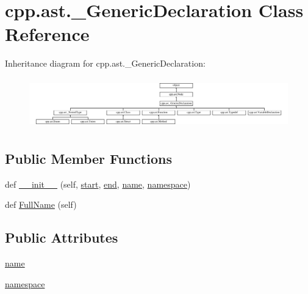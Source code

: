 \hypertarget{classcpp_1_1ast_1_1__GenericDeclaration}{}\section{cpp.\+ast.\+\_\+\+Generic\+Declaration Class Reference}
\label{classcpp_1_1ast_1_1__GenericDeclaration}
Inheritance diagram for cpp.\+ast.\+\_\+\+Generic\+Declaration\+:\begin{figure}[H]
\begin{center}
\leavevmode
\includegraphics[height=2.197802cm]{classcpp_1_1ast_1_1__GenericDeclaration}
\end{center}
\end{figure}
\subsection*{Public Member Functions}
\begin{DoxyCompactItemize}
\item 
def \mbox{\hyperlink{classcpp_1_1ast_1_1__GenericDeclaration_afde72751e20708a7802eb7707d23bc3c}{\+\_\+\+\_\+init\+\_\+\+\_\+}} (self, \mbox{\hyperlink{classcpp_1_1ast_1_1Node_a7b2aa97e6a049bb1a93aea48c48f1f44}{start}}, \mbox{\hyperlink{classcpp_1_1ast_1_1Node_a3c5e5246ccf619df28eca02e29d69647}{end}}, \mbox{\hyperlink{classcpp_1_1ast_1_1__GenericDeclaration_af774f4729dfd78d0538a6782fe8514c1}{name}}, \mbox{\hyperlink{classcpp_1_1ast_1_1__GenericDeclaration_a8aee3f11b37449d54b42a78e0a689f46}{namespace}})
\item 
def \mbox{\hyperlink{classcpp_1_1ast_1_1__GenericDeclaration_a1437d31271ea8cda62da22e2ce427a85}{Full\+Name}} (self)
\end{DoxyCompactItemize}
\subsection*{Public Attributes}
\begin{DoxyCompactItemize}
\item 
\mbox{\hyperlink{classcpp_1_1ast_1_1__GenericDeclaration_af774f4729dfd78d0538a6782fe8514c1}{name}}
\item 
\mbox{\hyperlink{classcpp_1_1ast_1_1__GenericDeclaration_a8aee3f11b37449d54b42a78e0a689f46}{namespace}}
\end{DoxyCompactItemize}


